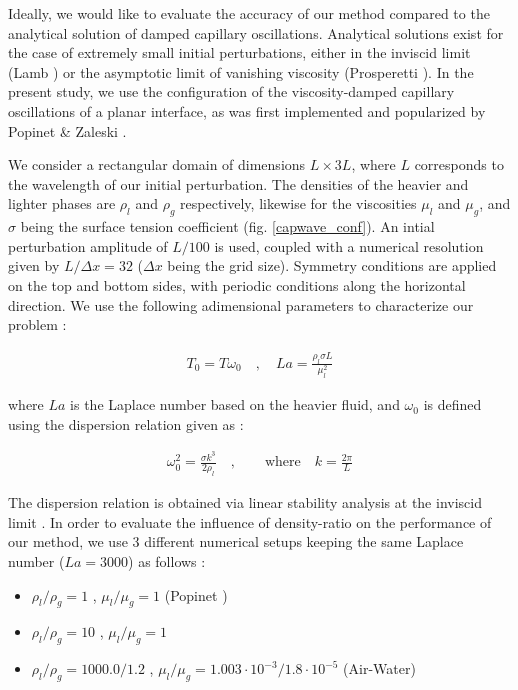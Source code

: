 Ideally, we would like to evaluate the accuracy of our method compared to the analytical solution of damped capillary oscillations. Analytical solutions exist for the case of extremely small initial perturbations, either in the inviscid limit (Lamb ) or the asymptotic limit of vanishing viscosity (Prosperetti ). In the present study, we use the configuration of the viscosity-damped capillary oscillations of a planar interface, as was first implemented and popularized by Popinet \& Zaleski \cite{popinet1999front}.  

We consider a rectangular domain of dimensions $L \times 3L$, where $L$ corresponds to the wavelength of our initial perturbation. The densities of the heavier and lighter phases are $\rho_l$ and $\rho_g$ respectively, likewise for the viscosities $\mu_l$ and $\mu_g$, and $\sigma$ being the surface tension coefficient (fig. \ref{capwave_conf}). An intial perturbation amplitude of $L/100$ is used, coupled with a numerical resolution given by $L/\Delta x= 32$ ($\Delta x$ being the grid size). Symmetry conditions are applied on the top and bottom sides, with periodic conditions along the horizontal direction. We use the following adimensional parameters to characterize our problem : 

\begin{align}
	T_0 = T \omega_0 \quad , \quad La = \frac{\rho_l \sigma L}{\mu_l^2}  
\end{align}

where $La$ is the Laplace number based on the heavier fluid, and $\omega_0$ is defined using the dispersion relation \cite{popinet2009accurate} given as : 

\begin{align}
	\omega_0^2 =  \frac{\sigma k^3}{2 \rho_l} \quad, \qquad \text{where} \quad k = \frac{2\pi}{L}   
\end{align}

The dispersion relation is obtained via linear stability analysis at the inviscid limit \cite{lamb1993hydrodynamics}. In order to evaluate the influence of density-ratio on the performance of our method, we use 3 different numerical setups keeping the same Laplace number ($La = 3000$) as follows : 

\begin{itemize}
	\item $\rho_l/\rho_g = 1$ , $\mu_l/\mu_g = 1$  (Popinet \cite{popinet2009accurate}) 
	\item $\rho_l/\rho_g = 10$ , $\mu_l/\mu_g = 1$   
	\item $\rho_l/\rho_g = 1000.0/1.2$ , $\mu_l/\mu_g = 1.003\cdot 10^{-3}/1.8\cdot 10^{-5}$ (Air-Water) 
\end{itemize}


